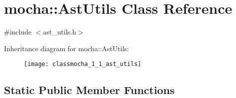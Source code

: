 \hypertarget{classmocha_1_1_ast_utils}{
\section{mocha::AstUtils Class Reference}
\label{classmocha_1_1_ast_utils}
}


{\ttfamily \#include $<$ast\_\-utils.h$>$}

Inheritance diagram for mocha::AstUtils:\begin{figure}[H]
\begin{center}
\leavevmode
\texttt{[image: classmocha\_1\_1\_ast\_utils]}
\end{center}
\end{figure}
\subsection*{Static Public Member Functions}
